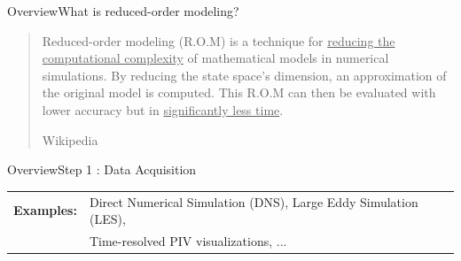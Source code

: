 \documentclass[usenames,dvipsnames,svgnames,10pt,aspectratio=169]{beamer}
\begin{document}

\begin{frame}[t, c]{Overview}{What is reduced-order modeling?}
	\centering

	\begin{quote}
		Reduced-order modeling (R.O.M) is a technique for \underline{reducing the computational complexity} of mathematical models in numerical simulations. By reducing the state space's dimension, an approximation of the original model is computed. This R.O.M can then be evaluated with lower accuracy but in \underline{significantly less time}.
		\\
		\begin{flushright}Wikipedia\end{flushright}
	\end{quote}

\end{frame}

\begin{frame}[t, c]{Overview}{Step 1 : Data Acquisition}
	\centering

	\vspace{-.25cm}


	\vspace{0.5cm}

	\begin{tabular}{ll}
		\textbf{Examples:} & Direct Numerical Simulation (DNS), Large Eddy Simulation (LES), \\
		~                  & Time-resolved PIV visualizations, ...
	\end{tabular}

\end{frame}
\end{document}
